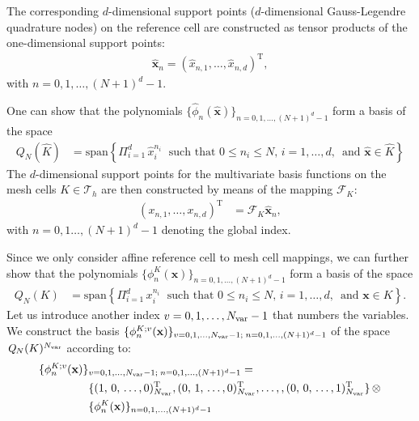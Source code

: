 \documentclass{scrreprt}
\theoremstyle{definition}
\theoremstyle{nonumberplain}
\renewcommand{\vec}[1]{{\textbf{#1}}}
\newcommand{\transp}{^\textrm{T}}
\newcommand{\tria}{\mathcal{T}_h}
\newcommand{\cell}{K}
\newcommand{\refVec}[1]{\hat{\vec{#1}}}
\newcommand{\refCell}{\hat{\cell}}
\newcommand{\mapping}{\boldsymbol{\mathcal{F}}_{\cell}}
\newcommand{\polyspace}[3]{\mathit{#1}_{#2}(#3)}
\begin{document}
The corresponding $d$-dimensional support points ($d$-dimensional
Gauss-Legendre quadrature nodes) on the reference cell are constructed as tensor
products of the one-dimensional support points:
\begin{align*}
\refVec{x}_n = (\hat{x}_{n,1},\ldots,\hat{x}_{n,d})\transp,
\end{align*}
with $n=0,1,\ldots,(N+1)^{d}-1$.

One can show that the polynomials $\{\hat{\phi}_n
(\refVec{x})\}_{n=0,1,\ldots,(N+1)^d-1}$ form a basis of the space
\begin{align*}
\polyspace{Q}{N}{\refCell} &= \text{span}\left\{ \Pi_{i=1}^d\,
\hat{x}_i^{n_i}\; \text{ such that }
0 \leq n_i \leq N,\,i=1,\ldots,d,\, \text{ and } \refVec{x} \in \refCell
\right\}
\end{align*}
The $d$-dimensional support points for the multivariate
basis functions on the mesh cells
$\cell\in\tria$ are then constructed by means of the mapping $\mapping:$
\begin{align*}
(x_{n,1},\ldots,x_{n,d})\transp
&=
\mapping\refVec{x}_n,
\end{align*}
with $n=0,1\ldots,(N+1)^d-1$ denoting the global index.

Since we only consider affine reference cell to mesh cell mappings, we can
further show that the polynomials $\{{\phi}^K_n
(\vec{x})\}_{n=0,1,\ldots,(N+1)^d-1}$ form a basis of the space
\begin{align*}
\polyspace{Q}{N}{\cell} &= \text{span}\left\{ \Pi_{i=1}^d\,
x_i^{n_i}\; \text{ such that }
0 \leq n_i \leq N,\,i=1,\ldots,d,\, \text{ and } \vec{x} \in \cell
\right\}.
\end{align*}
Let us introduce another index $v=0,1,\ldots,N_\textup{var}-1$
that numbers the variables.
We construct the basis $\{{\phi}^{K;v}_n
(\vec{x})\}_{v=0,1,\ldots,N_\textup{var}-1;\;n=0,1,\ldots,(N+1)^d-1}$
of the space
$\polyspace{Q}{N}{\cell}^{N_\textup{var}}$ according to:
\begin{align*}
\{{\phi}^{K;v}_n
(\vec{x})\}&_{v=0,1,\ldots,N_\textup{var}-1;\;n=0,1,\ldots,(N+1)^d-1}
= \\
&\lbrace
(
1,\,
0,\,
\ldots,
0
)_{N_\textup{var}}\transp
,
(
0,\,
1,\,
\ldots,
0
)_{N_\textup{var}}\transp
,
\ldots,
,
(
0,\,
0,\,
\ldots,
1
)_{N_\textup{var}}\transp
\rbrace
\,\otimes
\\
&\{{\phi}^K_n
(\vec{x})\}_{n=0,1,\ldots,(N+1)^d-1}
\end{align*}
\end{document}
